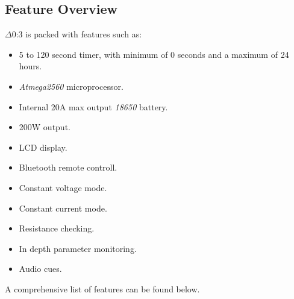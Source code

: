 \documentclass{article}
\begin{document}
\begin{multicols}{2}
	\section{Feature Overview}
	$\Delta$0:3 is packed with features such as:
	\begin{itemize}
		\item 5 to 120 second timer, with minimum of 0 seconds and a maximum of 24 hours.
		\item \textit{Atmega2560} microprocessor.
		\item Internal 20A max output \textit{18650} battery.
		\item 200W output.
		\item LCD display.
		\item Bluetooth remote controll.
		\item Constant voltage mode.
		\item Constant current mode.
		\item Resistance checking.
		\item In depth parameter monitoring.
		\item Audio cues.
	\end{itemize}
	A comprehensive list of features can be found below.
\end{multicols}
\end{document}
